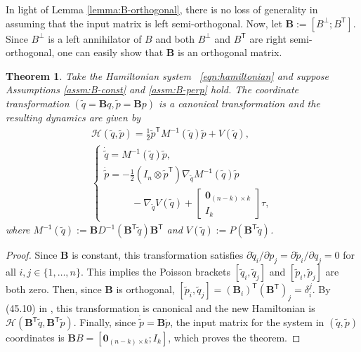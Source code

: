 \documentclass[journal,twoside,web]{ieeecolor}
\newtheorem{thm}{Theorem}%
\newcommand*{\tpose}{^\mathsf{T}}
\newcommand*{\Minv}{M^\mathsf{-1}}
\newcommand*{\Id}[1]{I_{#1}}
\newcommand*{\Zmat}[1]{\bm{0}_{#1}}
\newcommand*{\simpleB}{\begin{bmatrix}\Zmat{(n-k)\times k}\\ \Id{k}\end{bmatrix}}
\begin{document}
In light of Lemma \ref{lemma:B-orthogonal}, there is no loss of generality in
assuming that the input matrix is left semi-orthogonal.
Now, let \(\mathbf{B} := [B^\perp; B\tpose]\).
Since \(B^\perp\) is a left annihilator of \(B\) and both \(B^\perp\) and
\(B\tpose\) are right semi-orthogonal, one can easily show that \(\mathbf{B}\) is
an orthogonal matrix.

\begin{thm}\label{thm:simply-actuated}
    Take the Hamiltonian system ~\eqref{eqn:hamiltonian} and suppose
    Assumptions \ref{assm:B-const} and \ref{assm:B-perp} hold.
    The coordinate transformation
    \(\left(\tilde{q} = \mathbf{B}q, \tilde{p} = \mathbf{B}p\right)\)
    is a canonical transformation and the resulting dynamics are given by 
    \begin{gather}\label{eqn:simple-hamiltonian}
        \mathcal{H}(\tilde{q},\tilde{p}) = 
        \frac{1}{2} \tilde{p}\tpose \Minv(\tilde{q}) \tilde{p} + V(\tilde{q})
        , \\
       \begin{cases}
           \dot{\tilde{q}} = \Minv(\tilde{q})\tilde{p}
           , \\
           \dot{\tilde{p}} = -\frac{1}{2} (\Id{n} \otimes \tilde{p}\tpose)
           \nabla_{\tilde{q}} \Minv(\tilde{q}) \tilde{p} \\
           \phantom{---} - \nabla_{\tilde{q}} V(\tilde{q}) + \simpleB \tau
            ,
        \end{cases} \nonumber
    \end{gather}
    where 
    \(\Minv(\tilde{q}) := 
    \mathbf{B}D^{-1}(\mathbf{B}\tpose \tilde{q})\mathbf{B}\tpose\)
    and
    \(V(\tilde{q}) := P(\mathbf{B}\tpose \tilde{q})\).
\end{thm}
\begin{proof}
    Since \(\mathbf{B}\) is constant, this transformation satisfies
    \(\partial\tilde{q}_i/\partial p_j = \partial\tilde{p}_i/\partial q_j = 0\) for all 
    \(i,j \in \{1,\ldots,n\}\).
    This implies the Poisson brackets \([\tilde{q}_i, \tilde{q}_j]\)
    and \([\tilde{p}_i,\tilde{p}_j]\) are both zero.
    Then, since \(\mathbf{B}\) is orthogonal, 
    \([\tilde{p}_i, \tilde{q}_j] = (\mathbf{B}_i)\tpose (\mathbf{B}\tpose)_j
        = \delta_i^j\).
    By (45.10) in \cite{landau_mechanics}, this transformation is canonical and
    the new Hamiltonian is
    \(\mathcal{H}(\mathbf{B}\tpose \tilde{q}, \mathbf{B}\tpose \tilde{p})\).
    Finally, since \(\dot{\tilde{p}} = \mathbf{B} \dot{p}\), the input
    matrix for the system in \((\tilde{q},\tilde{p})\) coordinates is
    \(\mathbf{B}B = [\Zmat{(n-k)\times k}; \Id{k}]\), which proves the theorem.
\end{proof}
\end{document}
